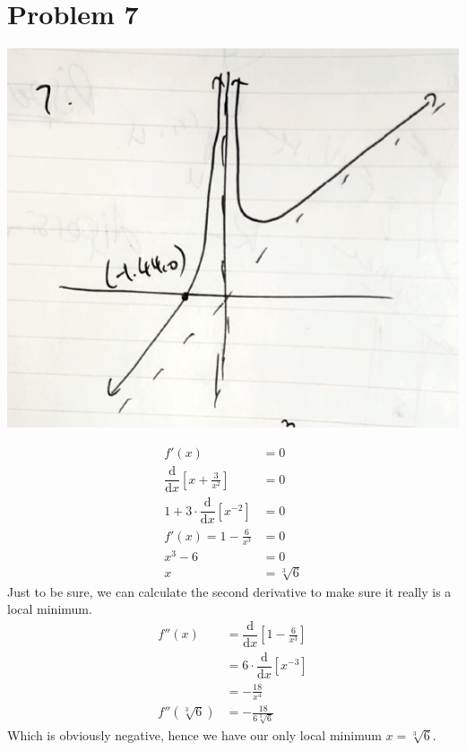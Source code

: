 \documentclass{article}
\newcommand*{\problem}[1]{\section*{Problem #1}}
\newcommand*{\Deriv}[2][x]{\ensuremath{\dfrac{\mathrm{d}}{\mathrm{d}#1}\left[#2\right]}}
\newcommand*{\cbrt}[1]{\ensuremath{\sqrt[3]{#1}}}
\begin{document}
\problem{7}
\begin{center}
	\includegraphics*[width=0.6\linewidth]{q7.png}
\end{center}
\begin{align*}
	f'(x)&=0 \\
	\Deriv{x+\frac{3}{x^2}}&=0 \\
	1+3\cdot\Deriv{x^{-2}}&=0 \\
	f'(x)=1-\frac{6}{x^3}&=0 \\
	x^3-6&=0 \\
	x&=\cbrt{6}
\end{align*}
Just to be sure, we can calculate the second derivative to make sure it really is a local minimum.
\begin{align*}
	f''(x)&=\Deriv{1-\frac{6}{x^3}} \\
	&=6\cdot\Deriv{x^{-3}} \\
	&=-\frac{18}{x^4} \\
	f''(\cbrt{6})&=-\frac{18}{6\cbrt{6}}
\end{align*}
Which is obviously negative, hence we have our only local minimum $x=\cbrt{6}$.
\end{document}
